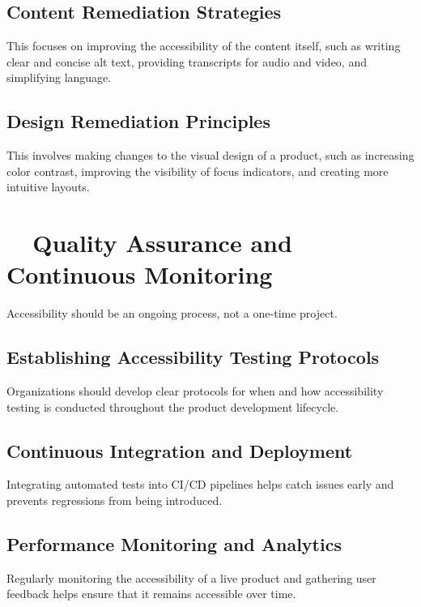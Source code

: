 \subsection{Content Remediation Strategies}
\label{subsec:content-remediation}
This focuses on improving the accessibility of the content itself, such as writing clear and concise alt text, providing transcripts for audio and video, and simplifying language.
\supercite{WCAGNonText2018}

\subsection{Design Remediation Principles}
\label{subsec:design-remediation}
This involves making changes to the visual design of a product, such as increasing color contrast, improving the visibility of focus indicators, and creating more intuitive layouts.
\supercite{Ware2012}

\section{~~Quality Assurance and Continuous Monitoring}
\label{sec:qa-monitoring}
Accessibility should be an ongoing process, not a one-time project.

\subsection{Establishing Accessibility Testing Protocols}
\label{subsec:testing-protocols}
Organizations should develop clear protocols for when and how accessibility testing is conducted throughout the product development lifecycle.

\subsection{Continuous Integration and Deployment}
\label{subsec:ci-cd}
Integrating automated  tests into CI/CD pipelines helps catch issues early and prevents regressions from being introduced.
\supercite{Fowler2013}

\subsection{Performance Monitoring and Analytics}
\label{subsec:performance-analytics}
Regularly monitoring the accessibility of a live product and gathering user feedback helps ensure that it remains accessible over time.

